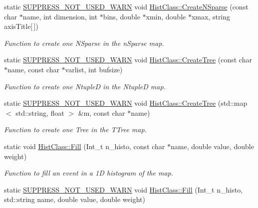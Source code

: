 \begin{DoxyCompactItemize}
static \hyperlink{HistClass_8hh_a85edd6ac47f5ea2970c76af20855738c}{S\-U\-P\-P\-R\-E\-S\-S\-\_\-\-N\-O\-T\-\_\-\-U\-S\-E\-D\-\_\-\-W\-A\-R\-N} void \hyperlink{namespaceHistClass_a254d1f7bca1d82049547093cc7755a5b}{Hist\-Class\-::\-Create\-N\-Sparse} (const char $\ast$name, int dimension, int $\ast$bins, double $\ast$xmin, double $\ast$xmax, string axis\-Title\mbox{[}$\,$\mbox{]})
\begin{DoxyCompactList}\small\item\em Function to create one N\-Sparse in the n\-Sparse map. \end{DoxyCompactList}\item 
static \hyperlink{HistClass_8hh_a85edd6ac47f5ea2970c76af20855738c}{S\-U\-P\-P\-R\-E\-S\-S\-\_\-\-N\-O\-T\-\_\-\-U\-S\-E\-D\-\_\-\-W\-A\-R\-N} void \hyperlink{namespaceHistClass_a6b2238e3440f49c8effd1c9c363ccdcc}{Hist\-Class\-::\-Create\-Tree} (const char $\ast$name, const char $\ast$varlist, int bufsize)
\begin{DoxyCompactList}\small\item\em Function to create one Ntuple\-D in the Ntuple\-D map. \end{DoxyCompactList}\item 
static \hyperlink{HistClass_8hh_a85edd6ac47f5ea2970c76af20855738c}{S\-U\-P\-P\-R\-E\-S\-S\-\_\-\-N\-O\-T\-\_\-\-U\-S\-E\-D\-\_\-\-W\-A\-R\-N} void \hyperlink{namespaceHistClass_ae9f060aaab764a00aaead1f45ac8c663}{Hist\-Class\-::\-Create\-Tree} (std\-::map$<$ std\-::string, float $>$ \&m, const char $\ast$name)
\begin{DoxyCompactList}\small\item\em Function to create one Tree in the T\-Tree map. \end{DoxyCompactList}\item 
static void \hyperlink{namespaceHistClass_afb5f8a57c50703889081b9b86a44ad4b}{Hist\-Class\-::\-Fill} (Int\-\_\-t n\-\_\-histo, const char $\ast$name, double value, double weight)
\begin{DoxyCompactList}\small\item\em Function to fill an event in a 1\-D histogram of the map. \end{DoxyCompactList}\item 
static \hyperlink{HistClass_8hh_a85edd6ac47f5ea2970c76af20855738c}{S\-U\-P\-P\-R\-E\-S\-S\-\_\-\-N\-O\-T\-\_\-\-U\-S\-E\-D\-\_\-\-W\-A\-R\-N} void \hyperlink{namespaceHistClass_ad3cd1cf763a65901cb1489de8edecc5c}{Hist\-Class\-::\-Fill} (Int\-\_\-t n\-\_\-histo, std\-::string name, double value, double weight)

\end{DoxyCompactItemize}
